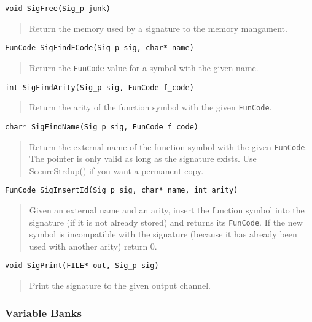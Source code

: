 \begin{verbatim}
void SigFree(Sig_p junk)
\end{verbatim}
\begin{quote}
  Return the memory used by a signature to the memory mangament.
\end{quote}

\begin{verbatim}
FunCode SigFindFCode(Sig_p sig, char* name)
\end{verbatim}
\begin{quote}
  Return the \texttt{FunCode} value for a symbol with the given name.
\end{quote}

\begin{verbatim}
int SigFindArity(Sig_p sig, FunCode f_code)
\end{verbatim}
\begin{quote}
  Return the arity of the function symbol with the given \texttt{FunCode}. 
\end{quote}

  \begin{verbatim}
char* SigFindName(Sig_p sig, FunCode f_code)
\end{verbatim}
\begin{quote}
  Return the external name of the function symbol with the given
  \texttt{FunCode}. The pointer is only valid as long as the signature
  exists. Use SecureStrdup() if you want a permanent copy.
\end{quote}

\begin{verbatim}
FunCode SigInsertId(Sig_p sig, char* name, int arity)
\end{verbatim}
\begin{quote}
  Given an external name and an arity, insert the function symbol into
  the signature (if it is not already stored) and returns its
  \texttt{FunCode}. If the new symbol is incompatible with the
  signature (because it has already been used with another arity)
  return 0.
\end{quote}

\begin{verbatim}
void SigPrint(FILE* out, Sig_p sig)
\end{verbatim}
\begin{quote}
  Print the signature to the given output channel.
\end{quote}


\subsubsection{Variable Banks}
\label{sec:terms:sigs:variables}

